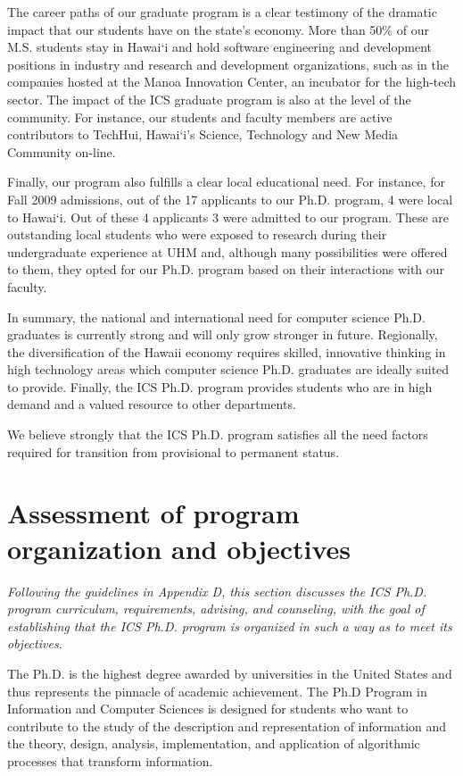 \documentclass[12pt]{article}
\begin{document}
The career paths of our graduate program is a clear testimony of the dramatic
impact that our students have on the state's economy. More than 50\%
of our M.S. students stay in Hawai`i and hold software engineering and
development positions in industry and research and development
organizations, such as in the companies hosted at the Manoa Innovation
Center, an incubator for the high-tech sector.  The impact of the ICS
graduate program is also at the level of the community.  For instance, our
students and faculty members are active contributors to TechHui,
Hawai`i's Science, Technology and New Media Community on-line.

Finally, our program also fulfills a clear local educational need. For
instance, for Fall 2009 admissions, out of the 17 applicants to our
Ph.D. program, 4 were local to Hawai`i.  Out of these 4 applicants 3
were admitted to our program. These are outstanding local students who
were exposed to research during their undergraduate experience at UHM
and, although many possibilities were offered to them, they opted for
our Ph.D. program based on their interactions with our faculty.

In summary, the national and international need for computer science
Ph.D. graduates is currently strong and will only grow stronger in future.
Regionally, the diversification of the Hawaii economy requires skilled,
innovative thinking in high technology areas which computer science
Ph.D. graduates are ideally suited to provide.  Finally, the ICS
Ph.D. program provides students who are in high demand and a valued
resource to other departments.   

We believe strongly that the ICS Ph.D. program satisfies all the need
factors required for transition from provisional to permanent status.

\section{Assessment of program organization and objectives}

{\em Following the guidelines in Appendix D, this section discusses the ICS
  Ph.D. program curriculum, requirements, advising, and counseling, with
  the goal of establishing that the ICS Ph.D. program is organized in such
  a way as to meet its objectives. }

The Ph.D. is the highest degree awarded by universities in the United
States and thus represents the pinnacle of academic achievement.  The Ph.D
Program in Information and Computer Sciences is designed for students who
want to contribute to the study of the description and representation of
information and the theory, design, analysis, implementation, and
application of algorithmic processes that transform information.
\end{document}
